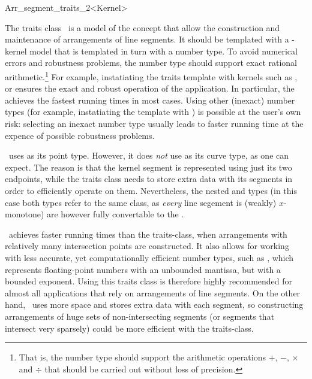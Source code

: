 
\ccRefPageBegin

\begin{ccRefClass}{Arr_segment_traits_2<Kernel>}
    
\ccDefinition 

The traits class \ccRefName\ is a model of the 
concept that allow the construction and maintenance of arrangements of
line segments. It should be templated with a \cgal-kernel model that is
templated in turn with a number type. To avoid numerical errors and
robustness problems, the number type should support exact rational
arithmetic.\footnote{That is, the number type should support the arithmetic
operations $+$, $-$, $\times$ and $\div$ that should be carried out
without loss of precision.} For example, instatiating the traits
template with kernels such as ,
or  ensures the exact and robust operation of
the application. In particular, the  achieves
the fastest running times in most cases. Using other (inexact) number
types (for example, instatiating the template with
) is possible at the user's own risk:
selecting an inexact number type usually leads to faster running time at
the expence of possible robustness problems.

\ccRefName\ uses  as its point type. However, it
does {\sl not} use  as its curve type, as one can
expect. The reason is that the kernel segment is represented using just
its two endpoints, while the traits class needs to store extra data with
its segments in order to efficiently operate on them. Nevertheless, the
nested  and  types (in this case both
types refer to the same class, as {\sl every} line segement is (weakly)
$x$-monotone) are however fully convertable to the .

\ccRefName\ achieves faster running times than the
 traits-class, when
arrangements with relatively many intersection points are constructed.
It also allows for working with less accurate, yet computationally
efficient number types, such as , which
represents floating-point numbers with an unbounded mantissa, but with
a bounded exponent. Using this traits class is therefore highly recommended
for almost all applications that rely on arrangements of line segments.
On the other hand, \ccRefName\  uses more space and stores extra data with
each segment, so constructing arrangements of huge sets of non-intersecting
segments (or segments that intersect very sparsely) could be more efficient
with the  traits-class.


\end{ccRefClass}
